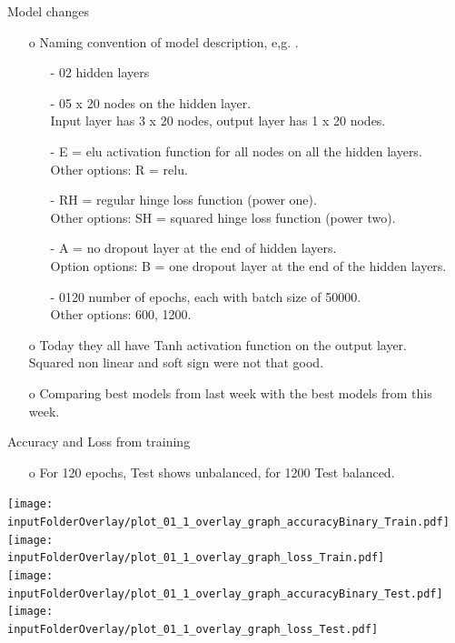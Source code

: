 \documentclass{beamer}
\begin{document}
\begin{frame}{Model changes}
\begin{enumerate}
\item[o] Naming convention of model description, e,g. \texttt{}.
\begin{enumerate}
\item[-] 02 hidden layers
\item[-] 05 x 20 nodes on the hidden layer. \\ Input layer has 3 x 20 nodes, output layer has 1 x 20 nodes.
\item[-] E = elu activation function for all nodes on all the hidden layers. \\ Other options: R = relu.
\item[-] RH = regular hinge loss function (power one). \\ Other options: SH = squared hinge loss function (power two).
\item[-] A = no dropout layer at the end of hidden layers. \\ Option options: B = one dropout layer at the end of the hidden layers.
\item[-] 0120 number of epochs, each with batch size of 50000. \\ Other options: 600, 1200. 
\end{enumerate}
\item[o] Today they all have Tanh activation function on the output layer. \\ Squared non linear and soft sign were not that good.
\item[o] Comparing best models from last week with the best models from this week.
\end{enumerate}
\end{frame}
\clearpage

\begin{frame}{Accuracy and Loss from training}
\begin{enumerate}
\item[o] For 120 epochs, Test shows unbalanced, for 1200 Test balanced.
\end{enumerate}
\texttt{[image: \\inputFolderOverlay/plot\_01\_1\_overlay\_graph\_accuracyBinary\_Train.pdf]}
\texttt{[image: \\inputFolderOverlay/plot\_01\_1\_overlay\_graph\_loss\_Train.pdf]} \\
\texttt{[image: \\inputFolderOverlay/plot\_01\_1\_overlay\_graph\_accuracyBinary\_Test.pdf]}
\texttt{[image: \\inputFolderOverlay/plot\_01\_1\_overlay\_graph\_loss\_Test.pdf]}
\end{frame}
\clearpage
\end{document}
